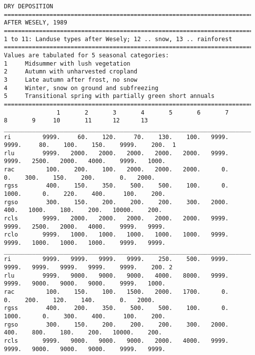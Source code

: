 \documentclass{egu}                  %
\begin{document}
\begin{scriptsize}\begin{verbatim}
DRY DEPOSITION
==============================================================================
AFTER WESELY, 1989
==============================================================================
1 to 11: Landuse types after Wesely; 12 .. snow, 13 .. rainforest
==============================================================================
Values are tabulated for 5 seasonal categories:
1     Midsummer with lush vegetation
2     Autumn with unharvested cropland
3     Late autumn after frost, no snow
4     Winter, snow on ground and subfreezing
5     Transitional spring with partially green short annuals
==============================================================================
               1       2       3       4       5       6       7       8       9     10       11      12      13  
________________________________________________________________________________________________________________
ri         9999.     60.    120.     70.    130.    100.   9999.   9999.     80.    100.    150.    9999.    200.  1
rlu        9999.   2000.   2000.   2000.   2000.   2000.   9999.   9999.   2500.   2000.   4000.    9999.   1000.
rac         100.    200.    100.   2000.   2000.   2000.      0.      0.    300.    150.    200.       0.   2000.
rgss        400.    150.    350.    500.    500.    100.      0.   1000.      0.    220.    400.     100.    200.
rgso        300.    150.    200.    200.    200.    300.   2000.    400.   1000.    180.    200.   10000.    200.
rcls       9999.   2000.   2000.   2000.   2000.   2000.   9999.   9999.   2500.   2000.   4000.    9999.   9999.
rclo       9999.   1000.   1000.   1000.   1000.   1000.   9999.   9999.   1000.   1000.   1000.    9999.   9999.
_________________________________________________________________________________________________________________
ri         9999.   9999.   9999.   9999.    250.    500.   9999.   9999.   9999.   9999.   9999.    9999.    200. 2
rlu        9999.   9000.   9000.   9000.   4000.   8000.   9999.   9999.   9000.   9000.   9000.    9999.   1000.
rac         100.    150.    100.   1500.   2000.   1700.      0.      0.    200.    120.    140.       0.   2000.
rgss        400.    200.    350.    500.    500.    100.      0.   1000.      0.    300.    400.     100.    200.
rgso        300.    150.    200.    200.    200.    300.   2000.    400.    800.    180.    200.   10000.    200.
rcls       9999.   9000.   9000.   9000.   2000.   4000.   9999.   9999.   9000.   9000.   9000.    9999.   9999.

\end{verbatim}
\end{scriptsize}
\end{document}
